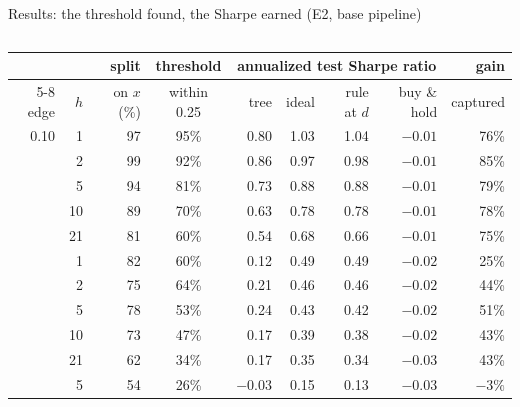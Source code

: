 \documentclass[10pt,aspectratio=169]{beamer}
\newcommand{\1}{\mathbf{1}}
\begin{document}
\begin{frame}{Results: the threshold found, the Sharpe earned (E2, base pipeline)}
\begin{columns}[T]
\scriptsize\setlength{\tabcolsep}{2.5pt}
\begin{tabular}{@{}rr rc rrrr r@{}}
\toprule
& & split & threshold & \multicolumn{4}{c}{annualized test Sharpe ratio} & gain\\
\cmidrule(lr){5-8}
edge & $h$ & on $x$ (\%) & within 0.25 & tree & ideal & rule at $d$ & buy \& hold & captured\\
\midrule
0.10 & 1 & 97 & 95\% & 0.80 & 1.03 & 1.04 & $-0.01$ & 76\%\\
 & 2 & 99 & 92\% & 0.86 & 0.97 & 0.98 & $-0.01$ & 85\%\\
 & 5 & 94 & 81\% & 0.73 & 0.88 & 0.88 & $-0.01$ & 79\%\\
 & 10 & 89 & 70\% & 0.63 & 0.78 & 0.78 & $-0.01$ & 78\%\\
 & 21 & 81 & 60\% & 0.54 & 0.68 & 0.66 & $-0.01$ & 75\%\\
\addlinespace
0.05 & 1 & 82 & 60\% & 0.12 & 0.49 & 0.49 & $-0.02$ & 25\%\\
 & 2 & 75 & 64\% & 0.21 & 0.46 & 0.46 & $-0.02$ & 44\%\\
 & 5 & 78 & 53\% & 0.24 & 0.43 & 0.42 & $-0.02$ & 51\%\\
 & 10 & 73 & 47\% & 0.17 & 0.39 & 0.38 & $-0.02$ & 43\%\\
 & 21 & 62 & 34\% & 0.17 & 0.35 & 0.34 & $-0.03$ & 43\%\\
\addlinespace
0.02 & 5 & 54 & 26\% & $-0.03$ & 0.15 & 0.13 & $-0.03$ & $-3\%$\\
\bottomrule
\end{tabular}


\end{columns}
\end{frame}
\end{document}

